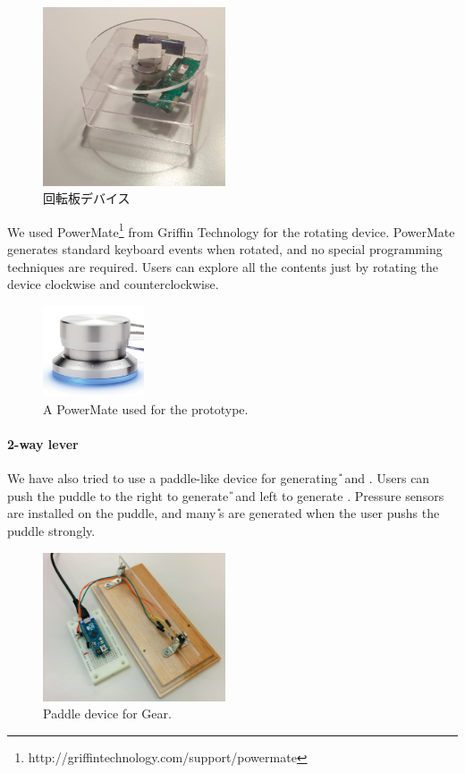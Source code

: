 \documentclass{article}
\begin{document}
\begin{figure}[H]
\centerline{\includegraphics[width=54mm,bb=0 0 362 354]{figures/ff2d18e66f9a4655dbb5e22e0bb9a0ae.png}}
\caption{回転板デバイス}
\label{disk}
\end{figure}

We used
PowerMate\footnote{
  \textsf{http://griffintechnology.com/support/powermate}
} from Griffin Technology for the rotating device.
PowerMate generates standard keyboard events when rotated,
and no special programming techniques are required.
%
Users can explore all the contents just by
rotating the device clockwise and counterclockwise.

\begin{figure}[H]
\centerline{\includegraphics[width=30mm,bb=0 0 389 348]{figures/d3a69499f7e7314ae6dc10f5bf3a2be5.png}}
\caption{A PowerMate used for the prototype.}
\label{powermate}
\end{figure}

\paragraph{2-way lever}

We have also tried to use a paddle-like device for generating {\U} and {\D}.
Users can push the puddle to the right to generate {\U} and
left to generate {\D}.
Pressure sensors are installed on the puddle, and
many {\U}s are generated when the user pushs the puddle strongly.

\begin{figure}[H]
  \centerline{\includegraphics[width=54mm,bb=0 0 514 418]{figures/3c2de63899653056f3c6be835b9aaf43.png}}
\caption{Paddle device for Gear.}
\label{paddle}
\end{figure}
\end{document}
